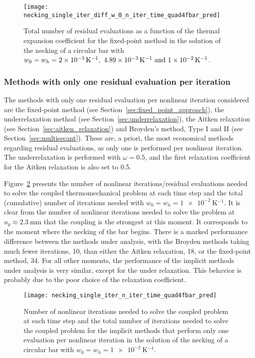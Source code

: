 \begin{figure}[htbp]
 \centering
 \texttt{[image: necking\_single\_iter\_diff\_w\_0\_n\_iter\_time\_quad4fbar\_pred]}
 \caption{Total number of residual evaluations as a function of the thermal expansion coefficient for the fixed-point method in the solution of the necking of a circular bar with \(w_0=w_h=\SIlist{2e-3; 4.89e-3; 1e-2}{\kelvin^{-1}}\).}
\label{fig:necking_single_iter_diff_w_0_n_iter_time_quad4fbar_pred}
\end{figure}

\subsubsection{Methods with only one residual evaluation per iteration}

The methods with only one residual evaluation per nonlinear iteration considered are the fixed-point method (see Section~\ref{sec:fixed_point_approach}), the underrelaxation method (see Section~\ref{sec:underrelaxation}), the Aitken relaxation (see Section~\ref{sec:aitken_relaxation}) and Broyden's method, Type I and II (see Section~\ref{sec:multisecant}).
These are, a priori, the most economical methods regarding residual evaluations, as only one is performed per nonlinear iteration.
The underrelaxation is performed with \(\omega = 0.5\), and the first relaxation coefficient for the Aitken relaxation is also set to 0.5.

Figure~\ref{fig:necking_single_iter_n_iter_time_quad4fbar_pred} presents the number of nonlinear iterations/residual evaluations needed to solve the coupled thermomechanical problem at each time step and the total (cumulative) number of iterations needed with \(w_0=w_h=\SI{1e-2}{\kelvin^{-1}}\).
It is clear from the number of nonlinear iterations needed to solve the problem at \(u_y\approx\SI{2.3}{\milli\meter}\) that the coupling is the strongest at this moment.
It corresponds to the moment where the necking of the bar begins.
There is a marked performance difference between the methods under analysis, with the Broyden methods taking much fewer iterations, 10, than either the Aitken relaxation, 18, or the fixed-point method, 34.
For all other moments, the performance of the implicit methods under analysis is very similar, except for the under relaxation.
This behavior is probably due to the poor choice of the relaxation coefficient.

\begin{figure}[htbp]
 \centering
 \texttt{[image: necking\_single\_iter\_n\_iter\_time\_quad4fbar\_pred]}
 \caption{Number of nonlinear iterations needed to solve the coupled problem at each time step and the total number of iterations needed to solve the coupled problem for the implicit methods that perform only one evaluation per nonlinear iteration in the solution of the necking of a circular bar with \(w_0=w_h=\SI{1e-2}{\kelvin^{-1}}\).}
\label{fig:necking_single_iter_n_iter_time_quad4fbar_pred}
\end{figure}

